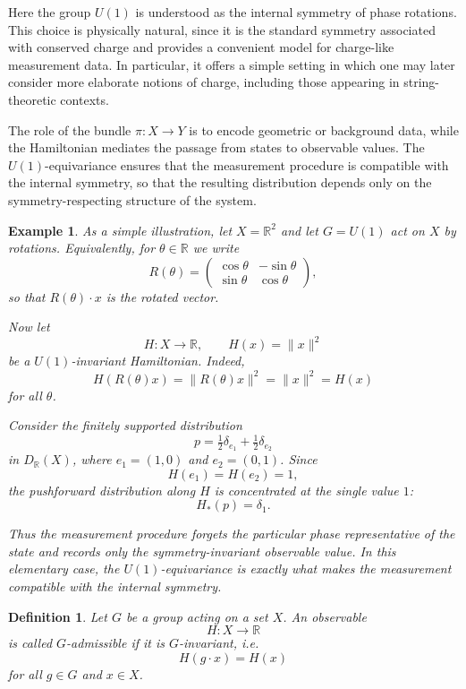 \documentclass{article}
\newtheorem{dn}{Definition}
\newtheorem{eg}{Example}
\numberwithin{tm}{section}
\numberwithin{dn}{section}
\numberwithin{as}{section}
\numberwithin{rk}{section}
\numberwithin{lem}{section}
\numberwithin{ax}{section}
\numberwithin{pp}{section}
\numberwithin{eg}{section}
\numberwithin{war}{section}
\numberwithin{equation}{section}
\numberwithin{prop}{section}
\numberwithin{nt}{section}
\numberwithin{rc}{section}
\numberwithin{setup}{section}
\begin{document}
Here the group $U(1)$ is understood as the internal symmetry of phase rotations. This choice is physically natural, since it is the standard symmetry associated with conserved charge and provides a convenient model for charge-like measurement data. In particular, it offers a simple setting in which one may later consider more elaborate notions of charge, including those appearing in string-theoretic contexts.

The role of the bundle $\pi: X \to Y$ is to encode geometric or background data, while the Hamiltonian mediates the passage from states to observable values. The $U(1)$-equivariance ensures that the measurement procedure is compatible with the internal symmetry, so that the resulting distribution depends only on the symmetry-respecting structure of the system.

\begin{eg}
	As a simple illustration, let $X=\mathbb{R}^2$ and let $G=U(1)$ act on $X$ by rotations. Equivalently, for $\theta \in \mathbb{R}$ we write
	\[
	R(\theta)=
	\begin{pmatrix}
		\cos\theta & -\sin\theta\\
		\sin\theta & \cos\theta
	\end{pmatrix},
	\]
	so that $R(\theta)\cdot x$ is the rotated vector.
	
	Now let
	\[
	H:X\to \mathbb{R}, \qquad H(x)=\|x\|^2
	\]
	be a $U(1)$-invariant Hamiltonian. Indeed,
	\[
	H(R(\theta)x)=\|R(\theta)x\|^2=\|x\|^2=H(x)
	\]
	for all $\theta$.
	
	Consider the finitely supported distribution
	\[
	p=\tfrac12\delta_{e_1}+\tfrac12\delta_{e_2}
	\]
	in $D_{\mathbb{R}}(X)$, where $e_1=(1,0)$ and $e_2=(0,1)$. Since
	\[
	H(e_1)=H(e_2)=1,
	\]
	the pushforward distribution along $H$ is concentrated at the single value $1$:
	\[
	H_*(p)=\delta_1.
	\]
	
	Thus the measurement procedure forgets the particular phase representative of the state and records only the symmetry-invariant observable value. In this elementary case, the $U(1)$-equivariance is exactly what makes the measurement compatible with the internal symmetry.
\end{eg}

\begin{dn}
	Let $G$ be a group acting on a set $X$. An observable
	\[
	H : X \to \mathbb{R}
	\]
	is called \emph{$G$-admissible} if it is $G$-invariant, i.e.
	\[
	H(g\cdot x) = H(x)
	\]
	for all $g \in G$ and $x \in X$.
\end{dn}
\end{document}
